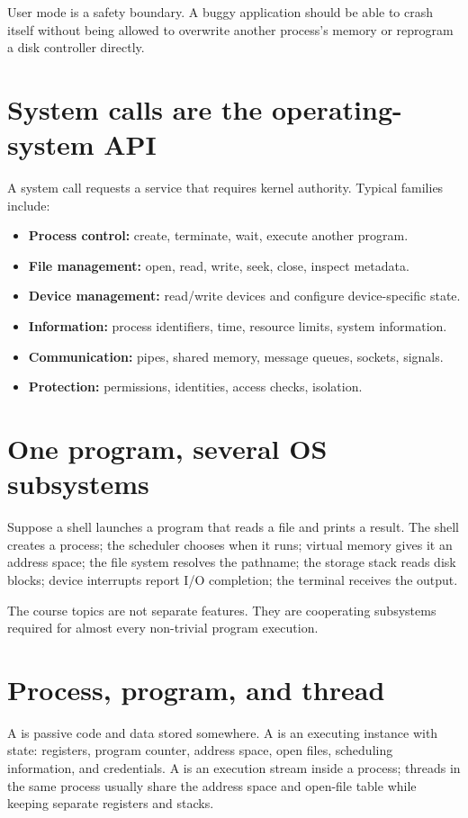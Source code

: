 \begin{intuition}
User mode is a safety boundary. A buggy application should be able to crash itself without being allowed to overwrite another process's memory or reprogram a disk controller directly.
\end{intuition}

\section{System calls are the operating-system API}
A system call requests a service that requires kernel authority. Typical families include:
\begin{itemize}
  \item \textbf{Process control:} create, terminate, wait, execute another program.
  \item \textbf{File management:} open, read, write, seek, close, inspect metadata.
  \item \textbf{Device management:} read/write devices and configure device-specific state.
  \item \textbf{Information:} process identifiers, time, resource limits, system information.
  \item \textbf{Communication:} pipes, shared memory, message queues, sockets, signals.
  \item \textbf{Protection:} permissions, identities, access checks, isolation.
\end{itemize}

\section{One program, several OS subsystems}
Suppose a shell launches a program that reads a file and prints a result. The shell creates a process; the scheduler chooses when it runs; virtual memory gives it an address space; the file system resolves the pathname; the storage stack reads disk blocks; device interrupts report I/O completion; the terminal receives the output.

\begin{keyidea}
The course topics are not separate features. They are cooperating subsystems required for almost every non-trivial program execution.
\end{keyidea}

\section{Process, program, and thread}
A  is passive code and data stored somewhere. A  is an executing instance with state: registers, program counter, address space, open files, scheduling information, and credentials. A  is an execution stream inside a process; threads in the same process usually share the address space and open-file table while keeping separate registers and stacks.

